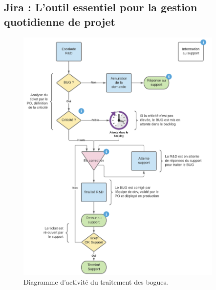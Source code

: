 \begin{appendices}

    \chapter[Jira : L'outil pour la gestion de projet]{Jira : L'outil essentiel pour la gestion quotidienne de projet}\label{ch:jira}

    \begin{figure}[h]
        \centering
        \includegraphics[width=0.91\textwidth]{img/lifecycle-of-bugs}
        \caption{Diagramme d'activité du traitement des bogues.}
        \label{fig:lifecycle-of-bugs}
    \end{figure}


\end{appendices}
